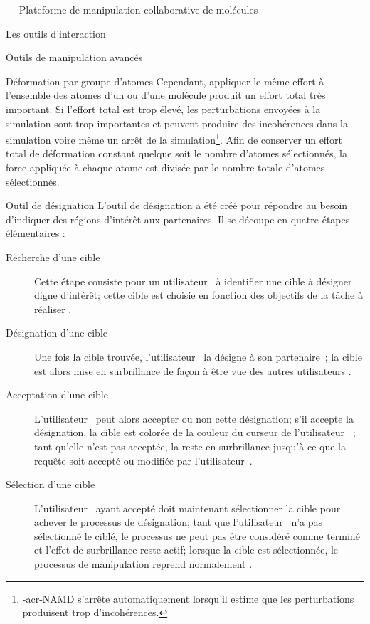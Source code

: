 \documentclass[myfrancais,ngerman,english,french]{mythesis}
\begin{document}
\begin{mychapter}{\myShaddock\ -- Plateforme de manipulation collaborative de molécules}
\begin{mysection}{Les outils d'interaction}
\begin{mysubsection}{Outils de manipulation avancés}
\begin{mysubsubsection}{Déformation par groupe d'atomes}
					Cependant, appliquer le même effort à l'ensemble des atomes d'un  ou d'une molécule produit un effort total très important.
					Si l'effort total est trop élevé, les perturbations envoyées à la simulation sont trop importantes et peuvent produire des incohérences dans la simulation voire même un arrêt de la simulation\footnote{\myacro-{acr-NAMD} s'arrête automatiquement lorsqu'il estime que les perturbations produisent trop d'incohérences.}.
					Afin de conserver un effort total de déformation constant quelque soit le nombre d'atomes sélectionnés, la force appliquée à chaque atome est divisée par le nombre totale d'atomes sélectionnés.
				\end{mysubsubsection}
				\begin{mysubsubsection}{Outil de désignation}
					L'outil de désignation a été créé pour répondre au besoin d'indiquer des régions d'intérêt aux partenaires.
					Il se découpe en quatre étapes élémentaires :
					\begin{description}
						\item[Recherche d'une cible] Cette étape consiste pour un utilisateur~ à identifier une cible à désigner digne d'intérêt;
							cette cible est choisie en fonction des objectifs de la tâche à réaliser .
						\item[Désignation d'une cible] Une fois la cible trouvée, l'utilisateur~ la désigne à son partenaire~;
							la cible est alors mise en surbrillance de façon à être vue des autres utilisateurs .
						\item[Acceptation d'une cible] L'utilisateur~ peut alors accepter ou non cette désignation;
							s'il accepte la désignation, la cible est colorée de la couleur du curseur de l'utilisateur~ ;
							tant qu'elle n'est pas acceptée, la  reste en surbrillance jusqu'à ce que la requête soit accepté ou modifiée par l'utilisateur~.
						\item[Sélection d'une cible] L'utilisateur~ ayant accepté doit maintenant sélectionner la cible pour achever le processus de désignation;
							tant que l'utilisateur~ n'a pas sélectionné le  ciblé, le processus ne peut pas être considéré comme terminé et l'effet de surbrillance reste actif;
							lorsque la cible est sélectionnée, le processus de manipulation reprend normalement .
					\end{description}


\end{mysubsubsection}
\end{mysubsection}
\end{mysection}
\end{mychapter}
\end{document}
